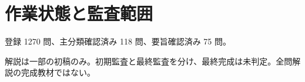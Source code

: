 \chapter{作業状態と監査範囲}
登録 1270 問、主分類確認済み 118 問、要旨確認済み 75 問。
\par 解説は一部の初稿のみ。初期監査と最終監査を分け、最終完成は未判定。全問解説の完成教材ではない。

